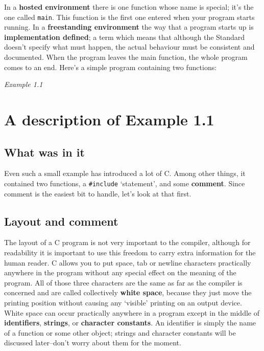   In a \textbf{hosted environment} there is one function whose name is
   special; it's the one called \texttt{main}. This function is the first
   one entered when your program starts running. In a \textbf{freestanding
   environment} the way that a program starts up is \textbf{implementation
   defined}; a term which means that although the Standard doesn't specify
   what must happen, the actual behaviour must be consistent and
   documented. When the program leaves the main function, the whole program
   comes to an end. Here's a simple program containing two functions:


  
  \begin{center}\textit{Example 1.1}\end{center}


 
        \section{A description of Example 1.1}
        

  

  \subsection{What was in it}
   

   Even such a small example has introduced a lot of C. Among other
    things, it contained two functions, a \texttt{\#include}
    `statement', and some \textbf{comment}. Since comment is the
    easiest bit to handle, let's look at that first.


  

  \subsection{Layout and comment}
   

   The layout of a C program is not very important to the compiler, although
    for readability it is important to use this freedom to carry extra
    information for the human reader. C allows you to put space, tab or newline
    characters practically anywhere in the program without any special effect
    on the meaning of the program. All of those three characters are the same
    as far as the compiler is concerned and are called collectively \textbf{white
    space}, because they just move the printing position without causing
    any `visible' printing on an output device. White space can occur
    practically anywhere in a program except in the middle of
    \textbf{identifiers}, \textbf{strings}, or \textbf{character
    constants}. An identifier is simply the name of a function or some
    other object; strings and character constants will be discussed
    later--don't worry about them for the moment.


